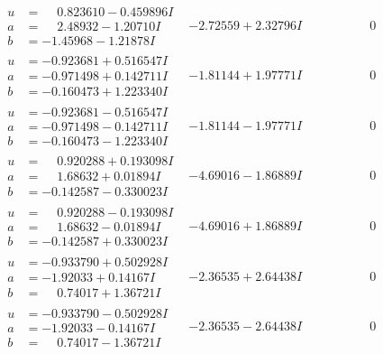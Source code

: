 \documentclass[1p]{elsarticle_modified}
\theoremstyle{definition}
\begin{document}
$$\begin{array}{c|c|c}
\begin{aligned}
u &= \phantom{-}0.823610 - 0.459896 I \\
a &= \phantom{-}2.48932 - 1.20710 I \\
b &= -1.45968 - 1.21878 I\end{aligned}
 & -2.72559 + 2.32796 I & \phantom{-0.000000 } 0 \\ \hline\begin{aligned}
u &= -0.923681 + 0.516547 I \\
a &= -0.971498 + 0.142711 I \\
b &= -0.160473 + 1.223340 I\end{aligned}
 & -1.81144 + 1.97771 I & \phantom{-0.000000 } 0 \\ \hline\begin{aligned}
u &= -0.923681 - 0.516547 I \\
a &= -0.971498 - 0.142711 I \\
b &= -0.160473 - 1.223340 I\end{aligned}
 & -1.81144 - 1.97771 I & \phantom{-0.000000 } 0 \\ \hline\begin{aligned}
u &= \phantom{-}0.920288 + 0.193098 I \\
a &= \phantom{-}1.68632 + 0.01894 I \\
b &= -0.142587 - 0.330023 I\end{aligned}
 & -4.69016 - 1.86889 I & \phantom{-0.000000 } 0 \\ \hline\begin{aligned}
u &= \phantom{-}0.920288 - 0.193098 I \\
a &= \phantom{-}1.68632 - 0.01894 I \\
b &= -0.142587 + 0.330023 I\end{aligned}
 & -4.69016 + 1.86889 I & \phantom{-0.000000 } 0 \\ \hline\begin{aligned}
u &= -0.933790 + 0.502928 I \\
a &= -1.92033 + 0.14167 I \\
b &= \phantom{-}0.74017 + 1.36721 I\end{aligned}
 & -2.36535 + 2.64438 I & \phantom{-0.000000 } 0 \\ \hline\begin{aligned}
u &= -0.933790 - 0.502928 I \\
a &= -1.92033 - 0.14167 I \\
b &= \phantom{-}0.74017 - 1.36721 I\end{aligned}
 & -2.36535 - 2.64438 I & \phantom{-0.000000 } 0 \\ \hline\begin{aligned}

\end{aligned}
\end{array}$$
\end{document}
